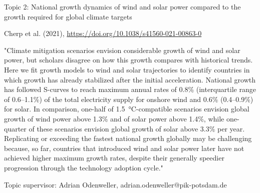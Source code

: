 \documentclass[10pt,aspectratio=169,dvipsnames]{beamer}
\begin{document}
\begin{frame}
  \begin{block}{Topic 2: National growth dynamics of wind and solar power compared to the growth required for global climate targets}
      
    Cherp et al. (2021), 
    \href{https://doi.org/10.1038/s41560-021-00863-0}{https://doi.org/10.1038/s41560-021-00863-0}
    
    "Climate mitigation scenarios envision considerable growth of wind and solar power, but scholars disagree on how this growth compares with historical trends. Here we fit growth models to wind and solar trajectories to identify countries in which growth has already stabilized after the initial acceleration. National growth has followed S-curves to reach maximum annual rates of 0.8\% (interquartile range of 0.6–1.1\%) of the total electricity supply for onshore wind and 0.6\% (0.4–0.9\%) for solar. In comparison, one-half of 1.5~°C-compatible scenarios envision global growth of wind power above 1.3\% and of solar power above 1.4\%, while one-quarter of these scenarios envision global growth of solar above 3.3\% per year. Replicating or exceeding the fastest national growth globally may be challenging because, so far, countries that introduced wind and solar power later have not achieved higher maximum growth rates, despite their generally speedier progression through the technology adoption cycle." 

    \hfill
    Topic supervisor: Adrian Odenweller, adrian.odenweller@pik-potsdam.de
    
  \end{block}
\end{frame}
\end{document}

